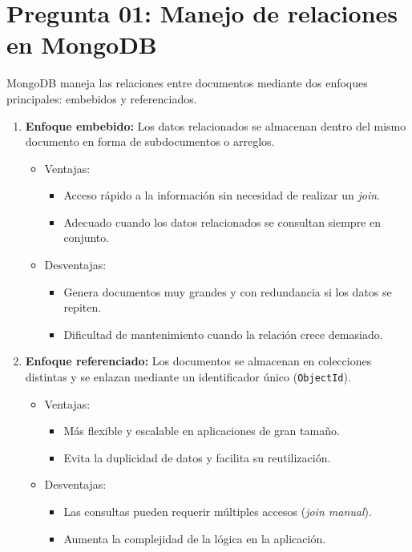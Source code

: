 \documentclass[11pt]{article}
\begin{document}
\section*{Pregunta 01: Manejo de relaciones en MongoDB}

MongoDB maneja las relaciones entre documentos mediante dos enfoques principales: embebidos y referenciados. 

\begin{enumerate}
    \item \textbf{Enfoque embebido:} Los datos relacionados se almacenan dentro del mismo documento en forma de subdocumentos o arreglos.
    \begin{itemize}
        \item Ventajas:
        \begin{itemize}
            \item Acceso rápido a la información sin necesidad de realizar un \textit{join}.
            \item Adecuado cuando los datos relacionados se consultan siempre en conjunto.
        \end{itemize}
        \item Desventajas:
        \begin{itemize}
            \item Genera documentos muy grandes y con redundancia si los datos se repiten.
            \item Dificultad de mantenimiento cuando la relación crece demasiado.
        \end{itemize}
    \end{itemize}

    \item \textbf{Enfoque referenciado:} Los documentos se almacenan en colecciones distintas y se enlazan mediante un identificador único (\texttt{ObjectId}).
    \begin{itemize}
        \item Ventajas:
        \begin{itemize}
            \item Más flexible y escalable en aplicaciones de gran tamaño.
            \item Evita la duplicidad de datos y facilita su reutilización.
        \end{itemize}
        \item Desventajas:
        \begin{itemize}
            \item Las consultas pueden requerir múltiples accesos (\textit{join manual}).
            \item Aumenta la complejidad de la lógica en la aplicación.
        \end{itemize}
    \end{itemize}
\end{enumerate}
\end{document}
